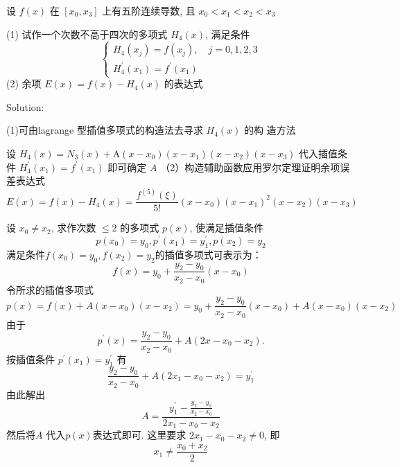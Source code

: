   \begin{tcolorbox}[enhanced,colback=10,colframe=9,breakable,coltitle=green!25!black,title=2024]
  

设 $ f(x) $ 在 $ \left[x_{0}, x_{3}\right] $ 上有五阶连续导数, 且 $ x_{0}<x_{1}<x_{2}<x_{3} $

(1) 试作一个次数不高于四次的多项式 $ H_{4}(x) $, 满足条件
$$
\left\{\begin{array}{l}
H_{4}\left(x_{j}\right)=f\left(x_{j}\right), \quad j=0,1,2,3 \\
H_{4}^{\prime}\left(x_{1}\right)=f^{\prime}\left(x_{1}\right)
\end{array}\right.
$$
(2) 余项 $ E(x)=f(x)-H_{4}(x) $ 的表达式
 \tcblower

Solution:

(1)可由lagrange 型插值多项式的构造法去寻求 $ H_{4}(x) $ 的构
造方法

设 $ H_{4}(x)=N_{3}(x)+\mathrm{A}\left(x-x_{0}\right)\left(x-x_{1}\right)\left(x-x_{2}\right)\left(x-x_{3}\right) $
代入插值条件 $ H_{4}^{\prime}\left(x_{1}\right)=f^{\prime}\left(x_{1}\right) $ 即可确定 $ A $
（2）构造辅助函数应用罗尔定理证明余项误差表达式
$$
E(x)=f(x)-H_{4}(x)=\frac{f^{(5)}(\xi)}{5 !}\left(x-x_{0}\right)\left(x-x_{1}\right)^{2}\left(x-x_{2}\right)\left(x-x_{3}\right)
$$

\end{tcolorbox}


  \begin{tcolorbox}[enhanced,colback=10,colframe=9,breakable,coltitle=green!25!black,title=2024]
  
设 $ x_{0} \neq x_{2} $, 求作次数 $ \leqslant 2 $ 的多项式 $ p(x) $, 使满足插值条件
$$
p\left(x_{0}\right)=y_{0}, p^{\prime}\left(x_{1}\right)=y_{1}^{\prime}, p\left(x_{2}\right)=y_{2}
$$
 \tcblower
满足条件$f\left(x_{0}\right)=y_{0}, f\left(x_{2}\right)=y_{2}$的插值多项式可表示为：
$$
f(x)=y_{0}+\frac{y_{2}-y_{0}}{x_{2}-x_{0}}\left(x-x_{0}\right)
$$
令所求的插值多项式
$$
p(x)  =f(x)+A\left(x-x_{0}\right)\left(x-x_{2}\right)  =y_{0}+\frac{y_{2}-y_{0}}{x_{2}-x_{0}}\left(x-x_{0}\right)+A\left(x-x_{0}\right)\left(x-x_{2}\right)
$$
由于
$$
p^{\prime}(x)=\frac{y_{2}-y_{0}}{x_{2}-x_{0}}+A\left(2 x-x_{0}-x_{2}\right) .
$$
按插值条件 $ p^{\prime}\left(x_{1}\right)=y_{1}^{\prime} $ 有
$$
\frac{y_{2}-y_{0}}{x_{2}-x_{0}}+A\left(2 x_{1}-x_{0}-x_{2}\right)=y_{1}^{\prime}
$$
由此解出
$$
A=\frac{y_{1}^{\prime}-\frac{y_{2}-y_{0}}{x_{2}-x_{0}}}{2 x_{1}-x_{0}-x_{2}}
$$
然后将$A$ 代入$p(x)$表达式即可. 这里要求 $ 2 x_{1}-x_{0}-x_{2} \neq 0 $, 即
$$
x_{1} \neq \frac{x_{0}+x_{2}}{2}
$$

\end{tcolorbox}



